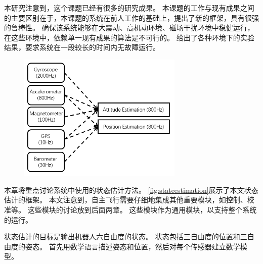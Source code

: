 \documentclass[
  type=master
]{gdutthesis}
\begin{document}
本研究注意到，这个课题已经有很多的研究成果\cite{mahony2008nonlinear,hua2010attitude,khosravian2016state}。
本课题的工作与现有成果之间的主要区别在于，本课题的系统在前人工作的基础上，提出了新的框架，具有很强的鲁棒性。
确保该系统能够在大震动、高机动环境、磁场干扰环境中稳健运行，在这些环境中，依赖单一现有成果的算法是不可行的。
给出了各种环境下的实验结果，要求系统在一段较长的时间内无故障运行。
\begin{figure}[htbp]
	\centering
	\includegraphics[width=0.7\textwidth]{屏幕截图 2022-03-31 170912.png}
	\label{fig:stateestimation}
\end{figure} 

本章将重点讨论系统中使用的状态估计方法。
\autoref{fig:stateestimation}展示了本文状态估计的框架。
本文注意到，自主飞行需要仔细地集成其他重要模块，如控制、校准等。
这些模块的讨论放到后面两章。
这些模块作为通用模块，以支持整个系统的运行。

状态估计的目标是输出机器人六自由度的状态。
状态包括三自由度的位置和三自由度的姿态。
首先用数学语言描述姿态和位置，然后对每个传感器建立数学模型。
\end{document}
